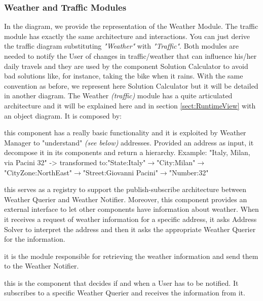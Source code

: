 	\subsubsection{Weather and Traffic Modules}
		\label{sect:WeatherTrafficModules}
		In the diagram, we provide the representation of the Weather Module. The traffic module has exactly the same architecture and interactions. You can just derive the traffic diagram substituting \textit{"Weather"} with \textit{"Traffic"}. Both modules are needed to notify the User of changes in traffic/weather that can influence his/her daily travels and they are used by the component Solution Calculator to avoid bad solutions like, for instance, taking the bike when it rains. With the same convention as before, we represent here Solution Calculator but it will be detailed in another diagram.\newline
		The Weather \textit{(traffic)} module has a quite articulated architecture and it will be explained here and in section \ref{sect:RuntimeView} with an object diagram.\newline
		It is composed by:
		\begin{description}[before={\renewcommand{\makelabel}[1]{-- \textit{##1}:}}]
			\item[Address Solver] this component has a really basic functionality and it is exploited by Weather Manager to "understand" \textit{(see below)} addresses. Provided an address as input, it decompose it in its components and return a hierarchy.\newline
			Example: "Italy, Milan, via Pacini 32" -> transformed to:\newline "State:Italy"$\rightarrow$"City:Milan"$\rightarrow$"CityZone:NorthEast"$\rightarrow$"Street:Giovanni Pacini"$\rightarrow$"Number:32"
			\item[Weather Manager] this serves as a registry to support the publish-subscribe architecture between Weather Querier and Weather Notifier. Moreover, this component provides an external interface to let other components have information about weather. When it receives a request of weather information for a specific address, it asks Address Solver to interpret the address and then it asks the appropriate Weather Querier for the information.
			\item[Weather Querier] it is the module responsible for retrieving the weather information and send them to the Weather Notifier.
			\item[Weather Notifier] this is the component that decides if and when a User has to be notified. It subscribes to a specific Weather Querier and receives the information from it. 
		\end{description}
